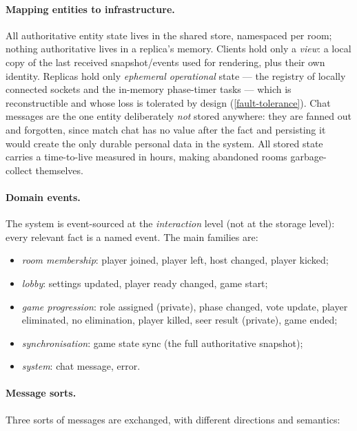 \documentclass{scrartcl}
\begin{document}
\paragraph{Mapping entities to infrastructure.}
All authoritative entity state lives in the shared store, namespaced per
room; nothing authoritative lives in a replica's memory. Clients hold only
a \emph{view}: a local copy of the last received snapshot/events used for
rendering, plus their own identity. Replicas hold only \emph{ephemeral
operational} state --- the registry of locally connected sockets and the
in-memory phase-timer tasks --- which is reconstructible and whose loss is
tolerated by design (\cref{fault-tolerance}). Chat messages are the one
entity deliberately \emph{not} stored anywhere: they are fanned out and
forgotten, since match chat has no value after the fact and persisting it
would create the only durable personal data in the system. All stored
state carries a time-to-live measured in hours, making abandoned rooms
garbage-collect themselves.

\paragraph{Domain events.}
The system is event-sourced at the \emph{interaction} level (not at the
storage level): every relevant fact is a named event. The main families
are:

\begin{itemize}
  \item \emph{room membership}: player joined, player left, host changed,
  player kicked;
  \item \emph{lobby}: settings updated, player ready changed, game start;
  \item \emph{game progression}: role assigned (private), phase changed,
  vote update, player eliminated, no elimination, player killed, seer
  result (private), game ended;
  \item \emph{synchronisation}: game state sync (the full authoritative
  snapshot);
  \item \emph{system}: chat message, error.
\end{itemize}

\paragraph{Message sorts.}
Three sorts of messages are exchanged, with different directions and
semantics:
\end{document}
